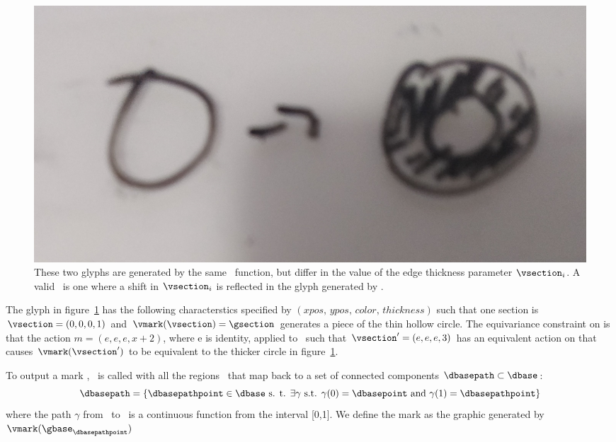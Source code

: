 \documentclass[../main.tex]{subfiles}
\begin{document}
\begin{figure}[H]
    \includegraphics[width=\textwidth]{figures/math/diff_type_q.png}
    \caption{These two glyphs are generated by the same \vmark\ function, but differ in the value of the edge thickness parameter $\vsection_i$. A valid \vmark\ is one where a shift in $\vsection_i$ is reflected in the glyph generated by \gsection.}
    \label{fig:artist_mark_change}
\end{figure}

The glyph in figure~\ref{fig:artist_mark_change} has the following characterstics \vfiber specified by  $(xpos,\, ypos,\, color,\, thickness)$ such that one section is $\vsection=(0,0,0,1)$ and $\vmark(\vsection) = \gsection$ generates a piece of the thin hollow circle. The equivariance constraint on \vmark is that the action $m=(e, e, e, x+2)$, where e is identity, applied to \vsection\ such that $\vsection^{\prime}=(e,e,e,3)$ has an equivalent action on \gsection that causes $\vmark(\vsection^{\prime})$ to be equivalent to the thicker circle in figure~\ref{fig:artist_mark_change}.


To output a mark  \cite{bertinIIPropertiesGraphic2011,carpendaleVisualRepresentationSemiology}, \vmark\ is called with all the regions \gbasepoint\ that map back to a set of connected components $\dbasepath \subset \dbase$:
\begin{equation}
\dbasepath = \{\dbasepathpoint \in \dbase \text{ s. t. } \exists \gamma \text{ s.t. } \gamma(0)=\dbasepoint \text{ and }\gamma(1)=\dbasepathpoint\}
\end{equation}
where the path\cite{ConnectedSpace2020}  $\gamma$ from \dbasepoint\ to \dbasepathpoint\ is a continuous function from the interval [0,1]. We define the mark as the graphic generated by $\vmark(\gbase_{\dbasepathpoint})$
\end{document}
